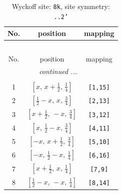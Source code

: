 \documentclass[fleqn,8pt]{jsarticle}
\begin{document}
\begin{longtable}{ccc}
\caption{Wyckoff site: {\tt 8k}, site symmetry: {\tt ..2'}}
 \\
 \hline \hline
No. & position & mapping \\ \hline \endfirsthead

\multicolumn{2}{l}{\tablename\ \thetable{}} \\
 \hline \hline
No. & position & mapping \\ \hline \endhead

 \hline \hline
\multicolumn{2}{r}{\footnotesize\it continued ...} \\ \endfoot

 \hline \hline
\multicolumn{2}{r}{} \\ \endlastfoot

1 & $\left[ x,\, x + \frac{1}{2},\, \frac{1}{4} \right]$ & {\tt [1,15]} \\ \hline
2 & $\left[ \frac{1}{2} - x,\, x,\, \frac{3}{4} \right]$ & {\tt [2,13]} \\ \hline
3 & $\left[ x + \frac{1}{2},\, - x,\, \frac{3}{4} \right]$ & {\tt [3,12]} \\ \hline
4 & $\left[ x,\, \frac{1}{2} - x,\, \frac{3}{4} \right]$ & {\tt [4,11]} \\ \hline
5 & $\left[ - x,\, x + \frac{1}{2},\, \frac{3}{4} \right]$ & {\tt [5,10]} \\ \hline
6 & $\left[ - x,\, \frac{1}{2} - x,\, \frac{1}{4} \right]$ & {\tt [6,16]} \\ \hline
7 & $\left[ x + \frac{1}{2},\, x,\, \frac{1}{4} \right]$ & {\tt [7,9]} \\ \hline
8 & $\left[ \frac{1}{2} - x,\, - x,\, \frac{1}{4} \right]$ & {\tt [8,14]} \\
\end{longtable}
\renewcommand{\arraystretch}{1.2}
\end{document}
